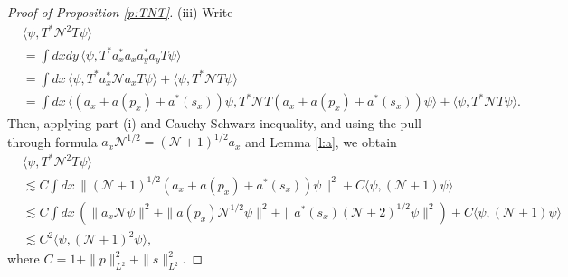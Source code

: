 \documentclass[11pt,a4paper]{scrartcl}
\newcommand{\N}{\mathcal{N}}
\begin{document}
\begin{proof}[Proof of Proposition \ref{p:TNT}]
  (iii) Write
  \begin{align*}
    & \langle \psi, T^* \N^2 T \psi \rangle \\
    & = \int dxdy \, \langle \psi, T^* a_x^* a_x a_y^* a_y T \psi \rangle \\
    & = \int dx \, \langle \psi, T^* a_x^* \N a_x T \psi \rangle + \langle
    \psi, T^* \N T \psi \rangle \\
    & = \int dx \, \langle (a_x + a(p_x) + a^*(s_x)) \psi, T^* \N T (a_x +
    a(p_x) + a^*(s_x)) \psi \rangle + \langle \psi, T^* \N T \psi \rangle.
  \end{align*}
  Then, applying part (i) and Cauchy-Schwarz inequality, and using the
  pull-through formula $a_x \N^{1/2} = (\N+1)^{1/2} a_x$ and Lemma \ref{l:a},
  we obtain
  \begin{align*}
    & \langle \psi, T^* \N^2 T \psi \rangle \\
    & \apprle C \int dx \, \| (\N+1)^{1/2} (a_x + a(p_x) + a^*(s_x)) \psi \|^2
    + C \langle \psi, (\N+1) \psi \rangle \\
    & \apprle C \int dx \, (\| a_x \N \psi \|^2 + \| a(p_x) \N^{1/2} \psi \|^2
    + \| a^*(s_x) (\N+2)^{1/2} \psi \|^2 ) + C \langle \psi, (\N+1) \psi
    \rangle \\
    & \apprle C^2 \langle \psi, (\N+1)^2 \psi \rangle,
  \end{align*}
  where $C = 1 + \| p \|_{L^2}^2 + \| s \|_{L^2}^2$.



\end{proof}
\end{document}
